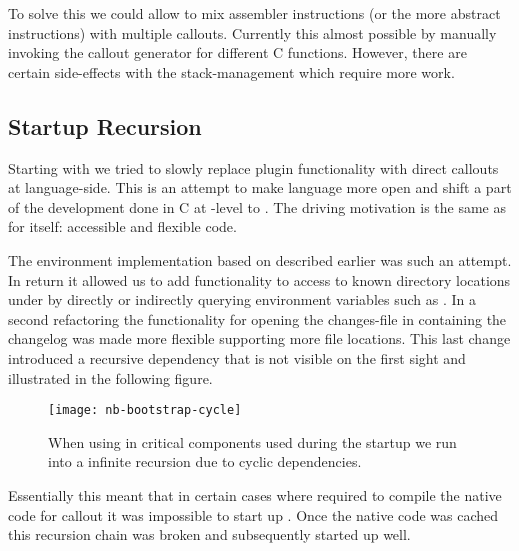 To solve this we could allow \NB to mix assembler instructions (or the more abstract \VCPU instructions) with multiple callouts.
Currently this almost possible by manually invoking the callout generator for different C functions.
However, there are certain side-effects with the stack-management which require more work.


\subsection{Startup Recursion}

Starting with  we tried to slowly replace \VM plugin functionality with direct \FFI callouts at language-side.
This is an attempt to make language more open and shift a part of the development done in C at \VM-level to \PH.
The driving motivation is the same as for \NB itself: accessible and flexible code.

The \OS environment implementation based on \NB described earlier was such an attempt.
In return it allowed us to add functionality to access to known directory locations under \Linux by directly or indirectly querying environment variables such as .
In a second refactoring the functionality for opening the changes-file in \PH containing the changelog was made more flexible supporting more file locations.
This last change introduced a recursive dependency that is not visible on the first sight and illustrated in the following figure.
%
\begin{figure}[h]
	\centering
	\texttt{[image: nb-bootstrap-cycle]}
	\caption[\NB Startup Recursion]{
	When using \NB in critical \PH components used during the startup we run into a infinite recursion due to cyclic dependencies.}
\end{figure}
%
Essentially this meant that in certain cases where \NB required to compile the native code for callout it was impossible to start up \PH.
Once the native code was cached this recursion chain was broken and subsequently \PH started up well.

